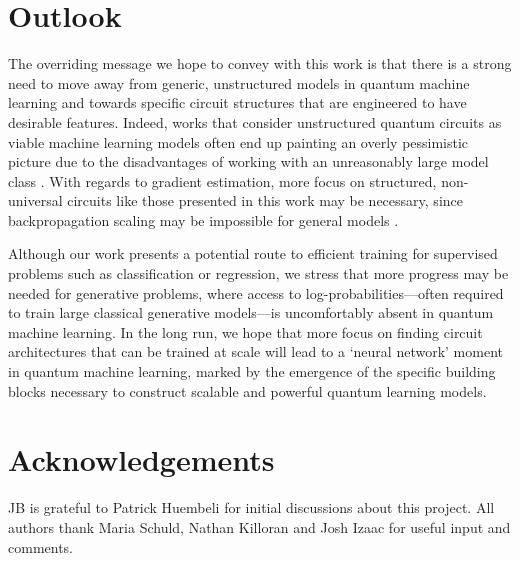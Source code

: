 \documentclass[a4paper,twocolumn,11pt,accepted=2025-09-06]{quantumarticle}
\begin{document}
\section{Outlook}
The overriding message we hope to convey with this work is that there is a strong need to move away from generic, unstructured models in quantum machine learning and towards specific circuit structures that are engineered to have desirable features. Indeed, works that consider unstructured quantum circuits as viable machine learning models often end up painting an overly pessimistic picture due to the disadvantages of working with an unreasonably large model class \cite{mcclean2018barren,anschuetz2022quantum,anschuetz2021critical,campos2021}. With regards to gradient estimation, more focus on structured, non-universal circuits like those presented in this work may be necessary, since backpropagation scaling may be impossible for general models \cite{abbas2023quantum}.
 

Although our work presents a potential route to efficient training for supervised problems such as classification or regression, we stress that more progress may be needed for generative problems, where access to log-probabilities---often required to train large classical generative models---is uncomfortably absent in quantum machine learning. In the long run, we hope that more focus on finding circuit architectures that can be trained at scale will lead to a `neural network' moment in quantum machine learning, marked by the emergence of the specific building blocks necessary to construct scalable and powerful quantum learning models. 

\section{Acknowledgements}
JB is grateful to Patrick Huembeli for initial discussions about this project. All authors thank Maria Schuld, Nathan Killoran and Josh Izaac for useful input and comments.






\appendix
\end{document}
